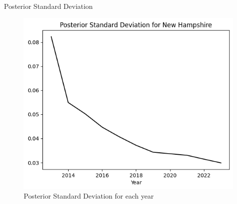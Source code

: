 \begin{frame}{Posterior Standard Deviation}

\begin{figure}
  \centering
  \includegraphics[width=.8\linewidth]{../Report/images/posterior-sd.png}
  \caption{Posterior Standard Deviation for each year}
\end{figure}

\end{frame}